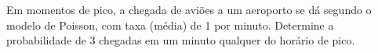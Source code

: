 %
%


\begin{exercicioBanco}[\valorquestao]
Em momentos de pico, a chegada de aviões a um aeroporto se dá segundo o modelo de Poisson, com taxa (média) de 1 por minuto. Determine a probabilidade de 3 chegadas em um minuto qualquer do horário de pico.
\end{exercicioBanco}

